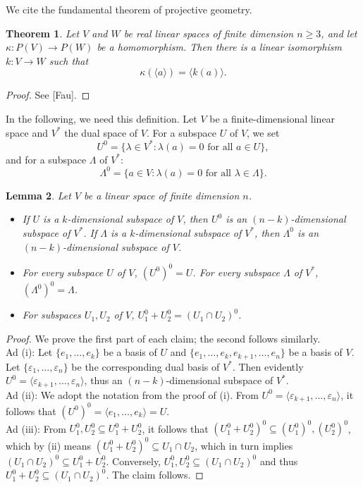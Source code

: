 \documentclass[11pt,a4paper]{article}
\newtheorem{theorem}{Theorem}[section]
\newtheorem{lemma}[theorem]{Lemma}
\begin{document}
We cite the fundamental theorem of projective geometry.

\begin{theorem} \label{thm:fundamental_projective}
Let $V$ and $W$ be real linear spaces of finite dimension $n \ge 3$, and let $\kappa: P(V) \to P(W)$ be a homomorphism. Then there is a linear isomorphism $k: V \to W$ such that
\[ \kappa(\langle a \rangle) = \langle k(a) \rangle. \]
\end{theorem}
\begin{proof}
See [Fau].
\end{proof}

In the following, we need this definition. Let $V$ be a finite-dimensional linear space and $V^*$ the dual space of $V$. For a subspace $U$ of $V$, we set
\[ U^0 = \{ \lambda \in V^* : \lambda(a) = 0 \text{ for all } a \in U \}, \]
and for a subspace $\Lambda$ of $V^*$:
\[ \Lambda^0 = \{ a \in V : \lambda(a) = 0 \text{ for all } \lambda \in \Lambda \}. \]

\begin{lemma} \label{lem:annihilator}
Let $V$ be a linear space of finite dimension $n$.
\begin{itemize}
    \item[(i)] If $U$ is a $k$-dimensional subspace of $V$, then $U^0$ is an $(n-k)$-dimensional subspace of $V^*$. If $\Lambda$ is a $k$-dimensional subspace of $V^*$, then $\Lambda^0$ is an $(n-k)$-dimensional subspace of $V$.
    \item[(ii)] For every subspace $U$ of $V$, $(U^0)^0 = U$. For every subspace $\Lambda$ of $V^*$, $(\Lambda^0)^0 = \Lambda$.
    \item[(iii)] For subspaces $U_1, U_2$ of $V$, $U_1^0 + U_2^0 = (U_1 \cap U_2)^0$.
\end{itemize}
\end{lemma}

\begin{proof}
We prove the first part of each claim; the second follows similarly. \\
Ad (i): Let $\{e_1, \dots, e_k\}$ be a basis of $U$ and $\{e_1, \dots, e_k, e_{k+1}, \dots, e_n\}$ be a basis of $V$. Let $\{\varepsilon_1, \dots, \varepsilon_n\}$ be the corresponding dual basis of $V^*$. Then evidently $U^0 = \langle \varepsilon_{k+1}, \dots, \varepsilon_n \rangle$, thus an $(n-k)$-dimensional subspace of $V^*$. \\
Ad (ii): We adopt the notation from the proof of (i). From $U^0 = \langle \varepsilon_{k+1}, \dots, \varepsilon_n \rangle$, it follows that $(U^0)^0 = \langle e_1, \dots, e_k \rangle = U$. \\
Ad (iii): From $U_1^0, U_2^0 \subseteq U_1^0 + U_2^0$, it follows that $(U_1^0 + U_2^0)^0 \subseteq (U_1^0)^0, (U_2^0)^0$, which by (ii) means $(U_1^0 + U_2^0)^0 \subseteq U_1 \cap U_2$, which in turn implies $(U_1 \cap U_2)^0 \subseteq U_1^0 + U_2^0$. Conversely, $U_1^0, U_2^0 \subseteq (U_1 \cap U_2)^0$ and thus $U_1^0 + U_2^0 \subseteq (U_1 \cap U_2)^0$. The claim follows.
\end{proof}
\end{document}
